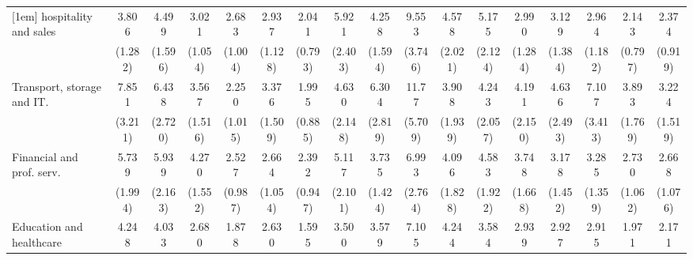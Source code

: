 {\begin{tabular}{l*{16}{c}}
[1em]
hospitality and sales&       3.806\sym{***}&       4.499\sym{***}&       3.021\sym{**} &       2.683\sym{**} &       2.937\sym{**} &       2.041         &       5.921\sym{***}&       4.258\sym{***}&       9.553\sym{***}&       4.578\sym{***}&       5.175\sym{***}&       2.990\sym{*}  &       3.129\sym{**} &       2.964\sym{**} &       2.143\sym{*}  &       2.374\sym{*}  \\
                    &     (1.282)         &     (1.596)         &     (1.054)         &     (1.004)         &     (1.128)         &     (0.793)         &     (2.403)         &     (1.594)         &     (3.746)         &     (2.021)         &     (2.124)         &     (1.284)         &     (1.384)         &     (1.182)         &     (0.797)         &     (0.919)         \\
[1em]
Transport, storage and IT.&       7.851\sym{***}&       6.438\sym{***}&       3.567\sym{**} &       2.250         &       3.376\sym{**} &       1.995         &       4.630\sym{***}&       6.304\sym{***}&       11.77\sym{***}&       3.908\sym{**} &       4.243\sym{**} &       4.191\sym{**} &       4.636\sym{**} &       7.107\sym{***}&       3.893\sym{**} &       3.224\sym{*}  \\
                    &     (3.211)         &     (2.720)         &     (1.516)         &     (1.015)         &     (1.509)         &     (0.885)         &     (2.148)         &     (2.819)         &     (5.709)         &     (1.939)         &     (2.057)         &     (2.150)         &     (2.493)         &     (3.413)         &     (1.769)         &     (1.519)         \\
[1em]
Financial and prof. serv.&       5.739\sym{***}&       5.939\sym{***}&       4.270\sym{***}&       2.527\sym{*}  &       2.664\sym{*}  &       2.392\sym{*}  &       5.117\sym{***}&       3.735\sym{***}&       6.993\sym{***}&       4.096\sym{**} &       4.583\sym{***}&       3.748\sym{**} &       3.178\sym{*}  &       3.285\sym{**} &       2.730\sym{**} &       2.668\sym{*}  \\
                    &     (1.994)         &     (2.163)         &     (1.552)         &     (0.987)         &     (1.054)         &     (0.947)         &     (2.101)         &     (1.424)         &     (2.764)         &     (1.828)         &     (1.922)         &     (1.668)         &     (1.452)         &     (1.359)         &     (1.062)         &     (1.076)         \\
[1em]
Education and healthcare&       4.248\sym{***}&       4.033\sym{***}&       2.680\sym{**} &       1.878         &       2.630\sym{*}  &       1.595         &       3.500\sym{**} &       3.579\sym{***}&       7.105\sym{***}&       4.244\sym{**} &       3.584\sym{**} &       2.939\sym{*}  &       2.927\sym{*}  &       2.915\sym{**} &       1.971         &       2.171         \\

\end{tabular}}
